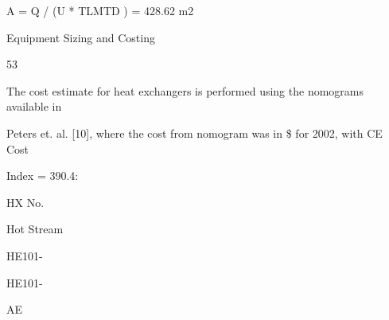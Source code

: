 \documentclass[a4paper,portrait,12pt]{article}
\begin{document}
\begin{flushleft}
A = Q / (U * TLMTD ) = 428.62 m2
\end{flushleft}





\begin{flushleft}
\newpage
Equipment Sizing and Costing
\end{flushleft}





53





\begin{flushleft}
The cost estimate for heat exchangers is performed using the nomograms available in
\end{flushleft}


\begin{flushleft}
Peters et. al. [10], where the cost from nomogram was in \$ for 2002, with CE Cost
\end{flushleft}


\begin{flushleft}
Index = 390.4:
\end{flushleft}





\begin{flushleft}
HX No.
\end{flushleft}





\begin{flushleft}
Hot Stream
\end{flushleft}





\begin{flushleft}
HE101-
\end{flushleft}





\begin{flushleft}
HE101-
\end{flushleft}





\begin{flushleft}
AE
\end{flushleft}
\end{document}
